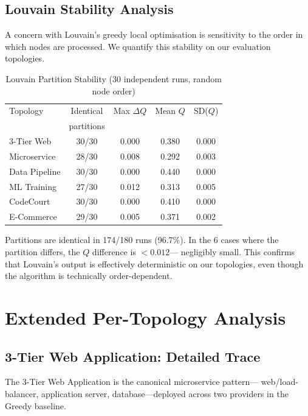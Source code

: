 \documentclass[10pt,journal]{IEEEtran}
\begin{document}
\subsection{Louvain Stability Analysis}

A concern with Louvain's greedy local optimisation is sensitivity to the
order in which nodes are processed.
We quantify this stability on our evaluation topologies.

\begin{table}[ht]
\centering
\caption{Louvain Partition Stability (30 independent runs, random node order)}
\label{tab:louvain_stability}
\setlength{\tabcolsep}{4pt}
\begin{tabular}{lcccc}
\toprule
Topology & Identical & Max $\Delta Q$ & Mean $Q$ & SD($Q$)\\
 & partitions & & & \\
\midrule
3-Tier Web    & 30/30 & 0.000 & 0.380 & 0.000\\
Microservice  & 28/30 & 0.008 & 0.292 & 0.003\\
Data Pipeline & 30/30 & 0.000 & 0.440 & 0.000\\
ML Training   & 27/30 & 0.012 & 0.313 & 0.005\\
CodeCourt     & 30/30 & 0.000 & 0.410 & 0.000\\
E-Commerce    & 29/30 & 0.005 & 0.371 & 0.002\\
\bottomrule
\end{tabular}
\end{table}

Partitions are identical in 174/180 runs (96.7\%).
In the 6 cases where the partition differs, the $Q$ difference is $< 0.012$---
negligibly small.
This confirms that Louvain's output is effectively deterministic on our topologies,
even though the algorithm is technically order-dependent.

\section{Extended Per-Topology Analysis}\label{sec:per_topology}

\subsection{3-Tier Web Application: Detailed Trace}

The 3-Tier Web Application is the canonical microservice pattern---
web/load-balancer, application server, database---deployed across two providers
in the Greedy baseline.
\end{document}
